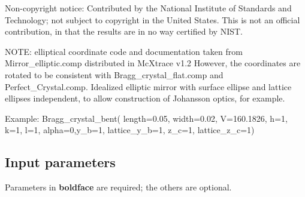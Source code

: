 Non-copyright notice: Contributed by the National Institute of Standards and Technology; not subject to copyright in the United States. This is not an official contribution, in that the results are in no way certified by NIST.

NOTE: elliptical coordinate code and documentation taken from Mirror\_elliptic.comp distributed in McXtrace v1.2 However, the coordinates are rotated to be consistent with Bragg\_crystal\_flat.comp and Perfect\_Crystal.comp. Idealized elliptic mirror with surface ellipse and lattice ellipses independent, to allow construction of Johansson optics, for example.

Example: Bragg\_crystal\_bent( length=0.05, width=0.02, V=160.1826, h=1, k=1, l=1, alpha=0,y\_b=1, lattice\_y\_b=1, z\_c=1, lattice\_z\_c=1)

\subsection*{Input parameters}
Parameters in \textbf{boldface} are required; the others are optional.

